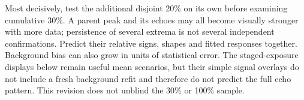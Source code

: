Most decisively, test the additional disjoint 20\% on its own before examining cumulative 30\%. A parent peak and its echoes may all become visually stronger with more data; persistence of several extrema is not several independent confirmations. Predict their relative signs, shapes and fitted responses together. Background bias can also grow in units of statistical error. The staged-exposure displays below remain useful mean scenarios, but their simple signal overlays do not include a fresh background refit and therefore do not predict the full echo pattern. This revision does not unblind the 30\% or 100\% sample.
